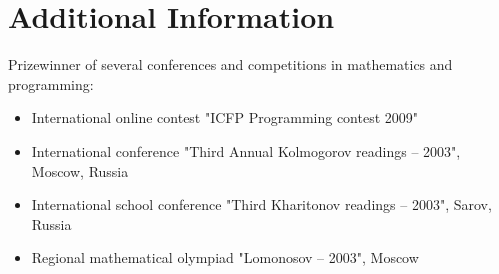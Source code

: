\documentclass[unicode,a4paper,10pt]{article}
\begin{document}
\section{Additional Information}
Prizewinner of several conferences and competitions in mathematics and programming:
\begin{itemize}
\item International online contest "ICFP Programming contest 2009"
\item International conference "Third Annual Kolmogorov readings -- 2003", Moscow, Russia
\item International school conference "Third Kharitonov readings -- 2003", Sarov, Russia
\item Regional mathematical olympiad "Lomonosov -- 2003", Moscow
\end{itemize}


\end{document}
